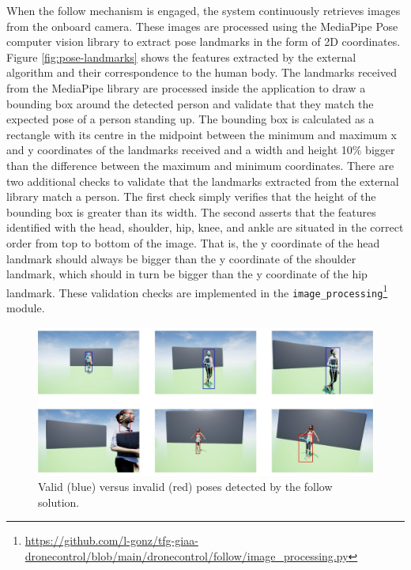 When the follow mechanism is engaged, the system continuously retrieves images from the onboard camera. These images are processed using the MediaPipe Pose \cite{mp-pose-paper} computer vision library to extract pose landmarks in the form of 2D coordinates.  Figure \ref{fig:pose-landmarks} shows the features extracted by the external algorithm and their correspondence to the human body. The landmarks received from the MediaPipe library are processed inside the application to draw a bounding box around the detected person and validate that they match the expected pose of a person standing up. The bounding box is calculated as a rectangle with its centre in the midpoint between the minimum and maximum x and y coordinates of the landmarks received and a width and height 10\% bigger than the difference between the maximum and minimum coordinates. There are two additional checks to validate that the landmarks extracted from the external library match a person. The first check simply verifies that the height of the bounding box is greater than its width. The second asserts that the features identified with the head, shoulder, hip, knee, and ankle are situated in the correct order from top to bottom of the image. That is, the y coordinate of the head landmark should always be bigger than the y coordinate of the shoulder landmark, which should in turn be bigger than the y coordinate of the hip landmark. These validation checks are implemented in the \texttt{image\_processing}\footnote{\url{https://github.com/l-gonz/tfg-giaa-dronecontrol/blob/main/dronecontrol/follow/image_processing.py}} module.

\begin{figure}
  \centering
  \includegraphics[width=\textwidth, keepaspectratio]{img/pose-validation.jpg}
  \caption{Valid (blue) versus invalid (red) poses detected by the follow solution.}
  \label{fig:pose-validation}
\end{figure}

